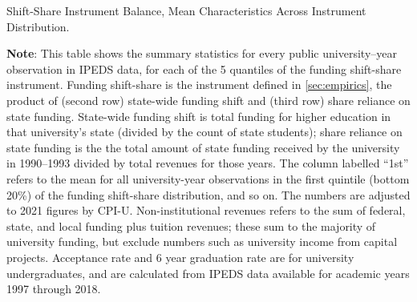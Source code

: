 \begin{table}[H]
    \singlespacing
    \centering
    \caption{Shift-Share Instrument Balance, Mean Characteristics Across Instrument Distribution.}
    \makebox[\textwidth][c]{}
    \label{tab:summary-quantiles}
    \justify
    \footnotesize
    \textbf{Note}:
    This table shows the summary statistics for every public university--year observation in IPEDS data, for each of the 5 quantiles of the funding shift-share instrument.
    Funding shift-share is the instrument defined in \autoref{sec:empirics}, the product of (second row) state-wide funding shift and (third row) share reliance on state funding.
    State-wide funding shift is total funding for higher education in that university's state (divided by the count of state students); share reliance on state funding is the the total amount of state funding received by the university in 1990--1993 divided by total revenues for those years. 
    The column labelled ``1st'' refers to the mean for all university-year observations in the first quintile (bottom 20\%) of the funding shift-share distribution, and so on.
    The numbers are adjusted to 2021 figures by CPI-U.
    Non-institutional revenues refers to the sum of federal, state, and local funding plus tuition revenues; these sum to the majority of university funding, but exclude numbers such as university income from capital projects.
    Acceptance rate and 6 year graduation rate are for university undergraduates, and are calculated from IPEDS data available for academic years 1997 through 2018.
\end{table}

